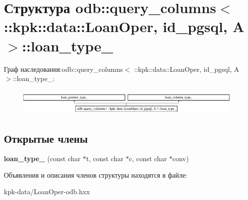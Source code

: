 \hypertarget{structodb_1_1query__columns_3_01_1_1kpk_1_1data_1_1_loan_oper_00_01id__pgsql_00_01_a_01_4_1_1loan__type__}{}\section{Структура odb\+:\+:query\+\_\+columns$<$ \+:\+:kpk\+:\+:data\+:\+:Loan\+Oper, id\+\_\+pgsql, A $>$\+:\+:loan\+\_\+type\+\_\+}
\label{structodb_1_1query__columns_3_01_1_1kpk_1_1data_1_1_loan_oper_00_01id__pgsql_00_01_a_01_4_1_1loan__type__}
Граф наследования\+:odb\+:\+:query\+\_\+columns$<$ \+:\+:kpk\+:\+:data\+:\+:Loan\+Oper, id\+\_\+pgsql, A $>$\+:\+:loan\+\_\+type\+\_\+\+:\begin{figure}[H]
\begin{center}
\leavevmode
\includegraphics[height=1.349398cm]{structodb_1_1query__columns_3_01_1_1kpk_1_1data_1_1_loan_oper_00_01id__pgsql_00_01_a_01_4_1_1loan__type__}
\end{center}
\end{figure}
\subsection*{Открытые члены}
\begin{DoxyCompactItemize}
\item 
{\bfseries loan\+\_\+type\+\_\+} (const char $\ast$t, const char $\ast$c, const char $\ast$conv)\hypertarget{structodb_1_1query__columns_3_01_1_1kpk_1_1data_1_1_loan_oper_00_01id__pgsql_00_01_a_01_4_1_1loan__type___a30181c7bcb6b3daf9694ed404a42de9d}{}\label{structodb_1_1query__columns_3_01_1_1kpk_1_1data_1_1_loan_oper_00_01id__pgsql_00_01_a_01_4_1_1loan__type___a30181c7bcb6b3daf9694ed404a42de9d}

\end{DoxyCompactItemize}


Объявления и описания членов структуры находятся в файле\+:\begin{DoxyCompactItemize}
\item 
kpk-\/data/Loan\+Oper-\/odb.\+hxx\end{DoxyCompactItemize}
